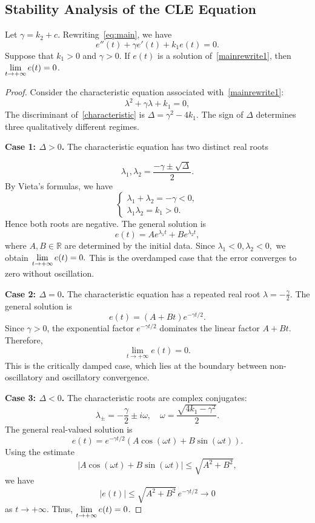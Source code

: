 ﻿\documentclass[12pt]{article}
\begin{document}
\subsection{Stability Analysis of the CLE Equation}
\begin{theorem}
  
Let $\gamma = k_2 + c$. Rewriting~\eqref{eq:main}, we have
\begin{equation}\label{mainrewrite1}
 e''(t) + \gamma e'(t) + k_1 e(t) = 0.
\end{equation}
Suppose that $k_1 > 0$ and $\gamma > 0$. If $e(t)$ is a solution of~\eqref{mainrewrite1}, then $\displaystyle \lim_{t \to + \infty} e(t) = 0$.
\end{theorem}
\begin{proof} Consider the characteristic equation associated with~\eqref{mainrewrite1}:
\begin{equation}\label{characteristic}
 \lambda^2 + \gamma\lambda + k_1 = 0,
\end{equation}
The discriminant of~\eqref{characteristic} is
$\Delta = \gamma^2 - 4k_1.$
The sign of $\Delta$ determines three qualitatively different regimes.

\textbf{Case 1: $\Delta > 0$.} The characteristic equation has two distinct real roots

\[
 \lambda_1,\lambda_2 = \frac{-\gamma \pm \sqrt{\Delta}}{2}.
\]
By Vieta's formulas, we have 
\[
 \begin{cases}
 \lambda_1 + \lambda_2 = -\gamma < 0,\\
 \lambda_1\lambda_2 = k_1 > 0.
 \end{cases}
\]
Hence both roots are negative. The general solution is
\[
 e(t) = Ae^{\lambda_1 t} + Be^{\lambda_2 t},
\]
where $A, B \in \mathbb R$ are determined by the initial data. Since
$\lambda_1 < 0,\lambda_2 < 0,$ we obtain
$\displaystyle \lim_{t \to + \infty} e(t) = 0.$
This is the overdamped case that the error converges to zero without oscillation.

\textbf{Case 2: $\Delta = 0$.} The characteristic equation has a repeated real root
$\lambda = -\frac{\gamma}{2}.$ The general solution is
\[
 e(t) = (A + Bt)e^{-\gamma t/2}.
\]
Since $\gamma > 0$, the exponential factor $e^{-\gamma t/2}$ dominates the linear factor $A + Bt$. Therefore,
\[
 \lim_{t \to + \infty} e(t) = 0.
\]
This is the critically damped case, which lies at the boundary between non-oscillatory and oscillatory convergence.

\textbf{Case 3: $\Delta < 0$.} The characteristic roots are complex conjugates:
\[
 \lambda_{\pm} = -\frac{\gamma}{2} \pm i\omega,\quad \omega = \frac{\sqrt{4k_1 - \gamma^2}}{2}.
\]
The general real-valued solution is
\[
 e(t) = e^{-\gamma t/2} \left( A\cos(\omega t) + B\sin(\omega t) \right).
\]
Using the estimate
\[
 \left|A\cos(\omega t) + B\sin(\omega t)\right| \leq \sqrt{A^2 + B^2},
\]
we have
\[
 |e(t)| \leq \sqrt{A^2 + B^2}\, e^{-\gamma t/2} \to 0
\]
as $t \to + \infty$. Thus, $\displaystyle \lim_{t \to + \infty} e(t) = 0$.
\end{proof}
\end{document}
